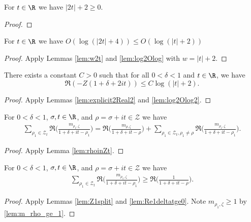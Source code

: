 
\begin{lemma}\label{lem:w2t}  \leanok
For $t\in\R$ we have $|2t|+2\ge0$.
\end{lemma}
\begin{proof} \leanok
\end{proof}

\begin{lemma}\label{lem:log2Olog2}  \leanok
For $t\in\R$ we have $O(\log(|2t|+4)) \le O(\log(|t|+2))$
\end{lemma}
\begin{proof} \leanok {}
Apply Lemmas \ref{lem:w2t} and \ref{lem:log2Olog} with $w=|t|+2$.
\end{proof}

\begin{lemma}\label{lem:Z2bound}  \leanok
There exists a constant $C>0$ such that for all $0<\delta<1$ and $t\in\R$, we have
\[ \Re\left(-Z(1+\delta+2it)\right) \le C\log(|t|+2).\]
\end{lemma}
\begin{proof}  \leanok
Apply Lemmas \ref{lem:explicit2Real2} and \ref{lem:log2Olog2}.
\end{proof}


\begin{lemma}\label{lem:Z1split}  \leanok
For $0<\delta<1$, $\sigma, t\in\R$, and $\rho=\sigma+it\in \mathcal Z$ we have
\begin{align*}
\sum_{\rho_1\in \mathcal Z_t} \Re\Big(\frac{m_{\rho_1,\zeta}}{1+\delta+it-\rho_1}\Big) = \Re\Big(\frac{m_{\rho,\zeta}}{1+\delta+it-\rho}\Big) + \sum_{\rho_1\in \mathcal Z_t, \rho_1 \neq \rho} \Re\Big(\frac{m_{\rho_1,\zeta}}{1+\delta+it-\rho_1}\Big).
\end{align*}
\end{lemma}
\begin{proof}  \leanok
Apply Lemma \ref{lem:rhoinZt}.
\end{proof}


\begin{lemma} \label{lem:Z1splitge}  \leanok
For $0<\delta<1$, $\sigma, t\in\R$, and $\rho=\sigma+it\in \mathcal Z$ we have
\begin{align*}
\sum_{\rho_1\in \mathcal Z_t} \Re\Big(\frac{m_{\rho_1,\zeta}}{1+\delta+it-\rho_1}\Big) \ge \Re\Big(\frac{1}{1+\delta+it-\rho}\Big).
\end{align*}
\end{lemma}
\begin{proof} 
\leanok
Apply Lemmas \ref{lem:Z1split} and \ref{lem:Re1deltatge0}. Note $m_{\rho_1,\zeta}\ge 1$ by \cref{lem:m_rho_ge_1}.
\end{proof}


